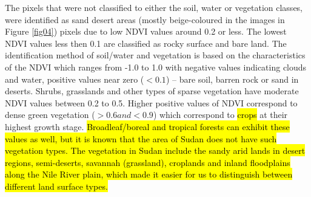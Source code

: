 \documentclass[jimaging,article,submit,pdftex,moreauthors]{Definitions/mdpi}
\begin{document}
The pixels that were not classified to either the soil, water or vegetation classes, were identified as sand desert areas (mostly beige-coloured in the images in Figure \ref{fig04}) pixels due to low NDVI values around 0.2 or less. The lowest NDVI values less then 0.1 are classified as rocky surface and bare land. The identification method of soil/water and vegetation is based on the characteristics of the NDVI which ranges from -1.0 to 1.0 with negative values indicating clouds and water, positive values near zero ($<0.1$) -- bare soil, barren rock or sand in deserts. Shrubs, grasslands and other types of sparse vegetation have moderate NDVI values between 0.2 to 0.5. Higher positive values of NDVI correspond to dense green vegetation ($>0.6 and <0.9$) which correspond to \hl{crops} at their highest growth stage. \hl{Broadleaf/boreal and tropical forests can exhibit these values as well, but it is known that the area of Sudan does not have such vegetation types. The vegetation in Sudan include the sandy arid lands in desert regions, semi-deserts, savannah (grassland), croplands and inland floodplains along the Nile River plain, which made it easier for us to distinguish between different land surface types.}
\end{document}
